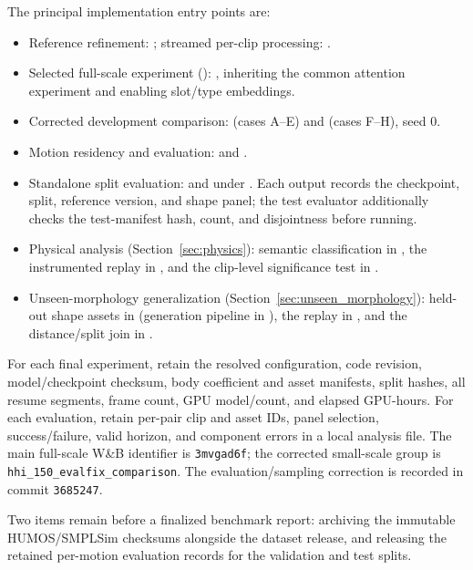 The principal implementation entry points are:
\begin{itemize}
    \item Reference refinement:
    ; streamed per-clip processing:
    .
    \item Selected full-scale experiment ():
    ,
    inheriting the common attention experiment and enabling slot/type embeddings.
    \item Corrected development comparison:
     (cases A--E) and
     (cases F--H), seed 0.
    \item Motion residency and evaluation:
     and
    .
    \item Standalone split evaluation:
     and 
    under . Each output records the checkpoint, split,
    reference version, and shape panel; the test evaluator additionally
    checks the test-manifest hash, count, and disjointness before running.
    \item Physical analysis (Section~\ref{sec:physics}): semantic
    classification in , the
    instrumented replay in ,
    and the clip-level significance test in
    .
    \item Unseen-morphology generalization (Section~\ref{sec:unseen_morphology}):
    held-out shape assets in 
    (generation pipeline in ), the
    replay in , and
    the distance/split join in
    .
\end{itemize}

For each final experiment, retain the resolved configuration, code revision,
model/checkpoint checksum, body coefficient and asset manifests, split hashes,
all resume segments, frame count, GPU model/count, and elapsed GPU-hours.
For each evaluation, retain per-pair clip and asset IDs, panel selection,
success/failure, valid horizon, and component errors in a local analysis file.
The main full-scale W\&B identifier is \texttt{3mvgad6f}; the corrected
small-scale group is \texttt{hhi\_150\_evalfix\_comparison}.
The evaluation/sampling correction is recorded in commit \texttt{3685247}.

Two items remain before a finalized benchmark report: archiving the
immutable HUMOS/SMPLSim checksums alongside the dataset release, and
releasing the retained per-motion evaluation records for the validation and
test splits.
